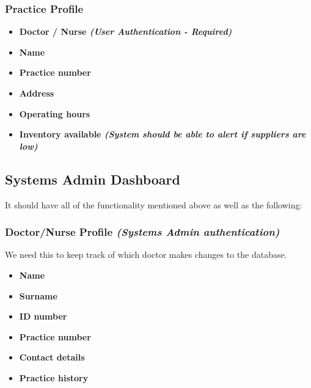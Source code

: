 \documentclass[a4paper]{article}
\begin{document}
\subsubsection{Practice Profile}

\begin{itemize}

\item \textbf{Doctor / Nurse \emph{(User Authentication - Required)}}

\item \textbf{Name}

\item \textbf{Practice number}

\item \textbf{Address}

\item \textbf{Operating hours}

\item \textbf{Inventory available \emph{(System should be able to alert if suppliers are low)}}

\end{itemize}

\subsection{Systems Admin Dashboard}

It should have all of the functionality mentioned above as well as the following:

\subsubsection{Doctor/Nurse Profile \emph{(Systems Admin authentication)}}

We need this to keep track of which doctor makes changes to the database.

\begin{itemize}

\item \textbf{Name}

\item \textbf{Surname}

\item \textbf{ID number}

\item \textbf{Practice number}

\item \textbf{Contact details}

\item \textbf{Practice history}

\end{itemize}
\end{document}
